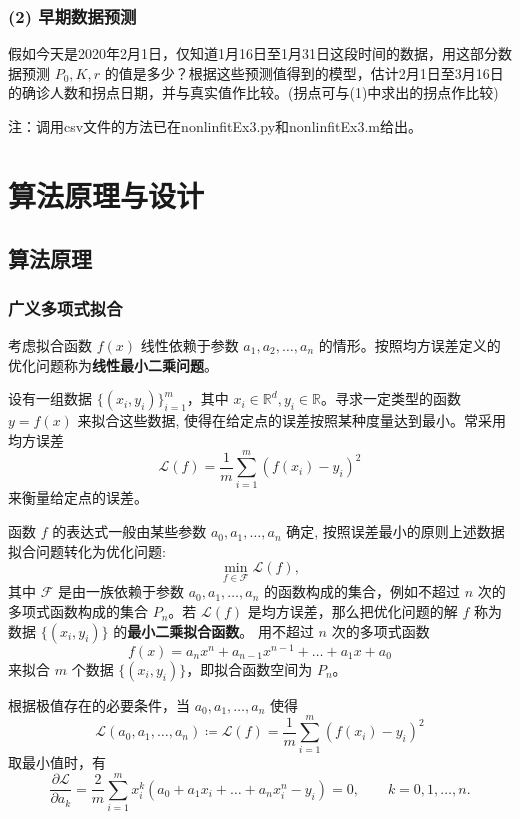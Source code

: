\documentclass{article}
\begin{document}
\subsubsection*{(2) 早期数据预测}
假如今天是2020年2月1日，仅知道1月16日至1月31日这段时间的数据，用这部分数据预测 \(P_0, K, r\) 的值是多少？根据这些预测值得到的模型，估计2月1日至3月16日的确诊人数和拐点日期，并与真实值作比较。(拐点可与(1)中求出的拐点作比较)

\vspace{0.5cm}
\noindent 注：调用csv文件的方法已在nonlinfitEx3.py和nonlinfitEx3.m给出。

\section{算法原理与设计}
\subsection{算法原理}
\subsubsection{广义多项式拟合}
考虑拟合函数 \(f(x)\) 线性依赖于参数 \(a_{1}, a_{2}, \dots , a_{n}\) 的情形。按照均方误差定义的优化问题称为\textbf{线性最小二乘问题}。

设有一组数据 \(\{(x_{i}, y_{i})\}_{i = 1}^{m}\)，其中 \(x_{i} \in \mathbb{R}^{d}, y_{i} \in \mathbb{R}\)。寻求一定类型的函数 \(y = f(x)\) 来拟合这些数据, 使得在给定点的误差按照某种度量达到最小。常采用均方误差
\[
\mathcal{L}(f) = \frac{1}{m}\sum_{i = 1}^{m}\left(f(x_{i}) - y_{i}\right)^{2}
\]
来衡量给定点的误差。

函数 \(f\) 的表达式一般由某些参数 \(a_{0}, a_{1}, \dots , a_{n}\) 确定, 按照误差最小的原则上述数据拟合问题转化为优化问题:
\[
\min_{f \in \mathcal{F}} \mathcal{L}(f),
\]
其中 \(\mathcal{F}\) 是由一族依赖于参数 \(a_{0}, a_{1}, \dots , a_{n}\) 的函数构成的集合，例如不超过 \(n\) 次的多项式函数构成的集合 \(P_{n}\)。若 \(\mathcal{L}(f)\) 是均方误差，那么把优化问题的解 \(f\) 称为数据 \(\{(x_{i}, y_{i})\}\) 的\textbf{最小二乘拟合函数}。
用不超过 \(n\) 次的多项式函数
\[
f(x) = a_{n}x^{n} + a_{n - 1}x^{n - 1} + \dots + a_{1}x + a_{0}
\]
来拟合 \(m\) 个数据 \(\{(x_{i},y_{i})\}\)，即拟合函数空间为 \(P_{n}\)。

根据极值存在的必要条件，当 \(a_{0},a_{1},\dots ,a_{n}\) 使得
\[
\mathcal{L}(a_{0},a_{1},\dots ,a_{n})\coloneqq \mathcal{L}(f) = \frac{1}{m}\sum_{i = 1}^{m}(f(x_{i}) - y_{i})^{2}
\]
取最小值时，有
\[
\frac{\partial\mathcal{L}}{\partial a_{k}} = \frac{2}{m}\sum_{i = 1}^{m}x_{i}^{k}(a_{0} + a_{1}x_{i} + \dots + a_{n}x_{i}^{n} - y_{i}) = 0,\qquad k = 0,1,\dots ,n.
\]
\end{document}
